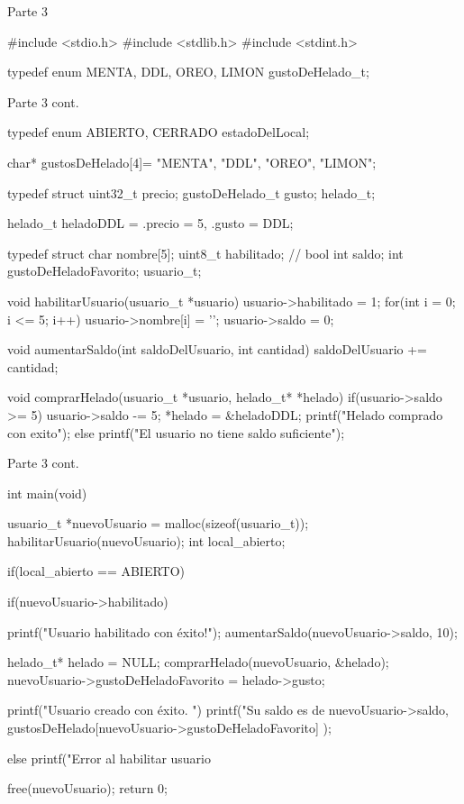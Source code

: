 \documentclass[]{scrartcl}
\begin{document}
\begin{cbox}[]{Parte 3}
  
#include <stdio.h>
#include <stdlib.h>
#include <stdint.h>

typedef enum{
    MENTA,
    DDL,
    OREO,
    LIMON
} gustoDeHelado_t;

\end{cbox}
\begin{cbox}[]{Parte 3 cont.}

typedef enum{
    ABIERTO,
    CERRADO
} estadoDelLocal;

char* gustosDeHelado[4]= {"MENTA", "DDL", "OREO", "LIMON"};

typedef struct{
    uint32_t precio;
    gustoDeHelado_t gusto;
} helado_t;

helado_t heladoDDL = {.precio = 5, .gusto = DDL}; 

typedef struct{
    char nombre[5];
    uint8_t habilitado; // bool
    int saldo;
    int gustoDeHeladoFavorito;
} usuario_t;

void habilitarUsuario(usuario_t *usuario){
    usuario->habilitado = 1;
    for(int i = 0; i <= 5; i++){
        usuario->nombre[i] = '\0';
    }
    usuario->saldo = 0;
}


void aumentarSaldo(int saldoDelUsuario, int cantidad){
    saldoDelUsuario += cantidad;
}

void comprarHelado(usuario_t *usuario, helado_t* *helado){
    if(usuario->saldo >= 5){
        usuario->saldo -= 5;
        *helado = &heladoDDL;
        printf("Helado comprado con exito\n");
    }else{
        printf("El usuario no tiene saldo suficiente\n");
    }
}

\end{cbox}
\begin{cbox}[]{Parte 3 cont.}

int main(void){
  usuario_t *nuevoUsuario = malloc(sizeof(usuario_t));
  habilitarUsuario(nuevoUsuario);
  int local_abierto;
  
  if(local_abierto == ABIERTO){
      if(nuevoUsuario->habilitado){
          printf("Usuario habilitado con éxito!\n");
          aumentarSaldo(nuevoUsuario->saldo, 10);

          helado_t* helado = NULL;
          comprarHelado(nuevoUsuario, &helado);
          nuevoUsuario->gustoDeHeladoFavorito = helado->gusto;

          printf("Usuario creado con éxito. \n")
          printf("Su saldo es de %
                nuevoUsuario->saldo, 
                gustosDeHelado[nuevoUsuario->gustoDeHeladoFavorito]
          );
      } else{
        printf("Error al habilitar usuario %
      }
  }
  free(nuevoUsuario);
  return 0;
}
\end{cbox}
\end{document}
